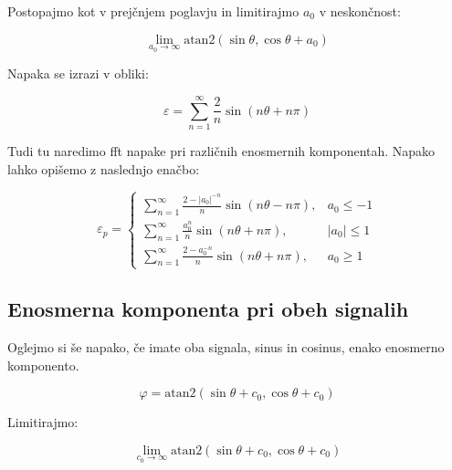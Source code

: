 Postopajmo kot v prejčnjem poglavju in limitirajmo $a_0$ v neskončnost:

\begin{equation}
\lim_{a_0 \rightarrow \infty} \mathrm{atan2}(\sin{\theta},\cos{\theta} + a_0)
\end{equation}

Napaka se izrazi v obliki:

\begin{equation}
\varepsilon = \sum_{n=1}^{\infty}\frac{2}{n} \sin (n \theta+ n \pi)
\end{equation}


Tudi tu naredimo fft napake pri različnih enosmernih komponentah. Napako lahko opišemo z naslednjo enačbo:

\begin{equation}
\label{vrsta_cosoff}
\varepsilon_p=
\begin{cases}
\sum_{n=1}^{\infty}\frac{2-|a_0|^{-n}}{n} \sin (n \theta - n \pi), & a_0\leq -1 \\
\sum_{n=1}^{\infty}\frac{a_0^n}{n} \sin (n \theta + n \pi), & |a_0|\leq 1 \\
\sum_{n=1}^{\infty}\frac{2-a_0^{-n}}{n} \sin (n \theta + n \pi), & a_0\geq 1
\end{cases}
\end{equation}


\newpage
\subsection{Enosmerna komponenta pri obeh signalih}

Oglejmo si še napako, če imate oba signala, sinus in cosinus, enako enosmerno komponento.


\begin{equation}
\varphi = \mathrm{atan2}(\sin{\theta} + c_0,\cos{\theta} + c_0)
\end{equation}

Limitirajmo:

\begin{equation}
\lim_{c_0 \rightarrow \infty} \mathrm{atan2}(\sin{\theta} + c_0,\cos{\theta}+ c_0) 
\end{equation}

